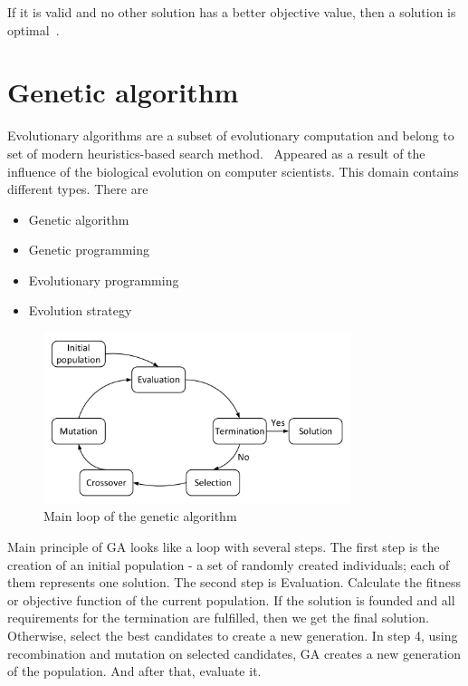 If it is valid and no other solution has a better objective value, then a solution is optimal~\cite{gotz18}.

\section{Genetic algorithm}
\label{sec:GeneticAlgorithm}

Evolutionary algorithms are a subset of evolutionary computation and belong to set of modern heuristics-based search method.~\cite{vikhar16}
Appeared as a result of the influence of the biological evolution on computer scientists. This domain contains different types.
There are

\begin{itemize}
	\item Genetic algorithm 
	\item Genetic programming
	\item Evolutionary programming
	\item Evolution strategy
\end{itemize}

\begin{figure}
	\centering
	\includegraphics[width=0.8\textwidth]{images/GeneticLoop}
	\caption[Main loop of the genetic algorithm]{Main loop of the genetic algorithm}
	\label{fig:GeneticLoop}
\end{figure}

Main principle of GA looks like a loop with several steps.
The first step is the creation of an initial population - a set of randomly created individuals; each of them represents one solution. 
The second step is Evaluation. Calculate the fitness or objective function of the current population.
If the solution is founded and all requirements for the termination are fulfilled, then we get the final solution. Otherwise, select the best candidates to create a new generation.
In step 4, using recombination and mutation on selected candidates, GA creates a new generation of the population. And after that, evaluate it.

